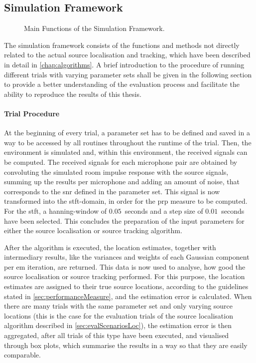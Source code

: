 \subsection{Simulation Framework}
\begin{figure}[H]
	\centering
	
	\caption{Main Functions of the Simulation Framework.}
	\label{diag:simulationFramework}
\end{figure}

The simulation framework consists of the functions and methods not directly related to the actual source localisation and tracking, which have been described in detail in \autoref{chap:algorithms}. A brief introduction to the procedure of running different trials with varying parameter sets shall be given in the following section to provide a better understanding of the evaluation process and facilitate the ability to reproduce the results of this thesis.

\paragraph{Trial Procedure}
At the beginning of every trial, a parameter set has to be defined and saved in a way to be accessed by all routines throughout the runtime of the trial. Then, the environment is simulated and, within this environment, the received signals can be computed. The received signals for each microphone pair are obtained by convoluting the simulated room impulse response with the source signals, summing up the results per microphone and adding an amount of noise, that corresponds to the \gls{snr} defined in the parameter set. This signal is now transformed into the \gls{stft}-domain, in order for the \gls{prp} measure to be computed. For the \gls{stft}, a hanning-window of $0.05$~seconds and a step size of $0.01$~seconds have been selected. This concludes the preparation of the input parameters for either the source localisation or source tracking algorithm.


After the algorithm is executed, the location estimates, together with intermediary results, like the variances and weights of each Gaussian component per \gls{em} iteration, are returned. This data is now used to analyse, how good the source localisation or source tracking performed. For this purpose, the location estimates are assigned to their true source locations, according to the guidelines stated in \autoref{sec:performanceMeasure}, and the estimation error is calculated. When there are many trials with the same parameter set and only varying source locations (this is the case for the evaluation trials of the source localisation algorithm described in \autoref{sec:evalScenariosLoc}), the estimation error is then aggregated, after all trials of this type have been executed, and visualised through box plots, which summarise the results in a way so that they are easily comparable.


